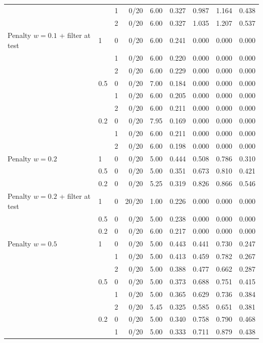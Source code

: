 {\begin{tabular}{llrrrrrrr}
 &  & 1 & 0/20 & 6.00 & 0.327 & 0.987 & 1.164 & 0.438 \\
 &  & 2 & 0/20 & 6.00 & 0.327 & 1.035 & 1.207 & 0.537 \\
\addlinespace
Penalty $w{=}0.1$ + filter at test & 1 & 0 & 0/20 & 6.00 & 0.241 & 0.000 & 0.000 & 0.000 \\
 &  & 1 & 0/20 & 6.00 & 0.220 & 0.000 & 0.000 & 0.000 \\
 &  & 2 & 0/20 & 6.00 & 0.229 & 0.000 & 0.000 & 0.000 \\
 & 0.5 & 0 & 0/20 & 7.00 & 0.184 & 0.000 & 0.000 & 0.000 \\
 &  & 1 & 0/20 & 6.00 & 0.205 & 0.000 & 0.000 & 0.000 \\
 &  & 2 & 0/20 & 6.00 & 0.211 & 0.000 & 0.000 & 0.000 \\
 & 0.2 & 0 & 0/20 & 7.95 & 0.169 & 0.000 & 0.000 & 0.000 \\
 &  & 1 & 0/20 & 6.00 & 0.211 & 0.000 & 0.000 & 0.000 \\
 &  & 2 & 0/20 & 6.00 & 0.198 & 0.000 & 0.000 & 0.000 \\
\addlinespace
Penalty $w{=}0.2$ & 1 & 0 & 0/20 & 5.00 & 0.444 & 0.508 & 0.786 & 0.310 \\
 & 0.5 & 0 & 0/20 & 5.00 & 0.351 & 0.673 & 0.810 & 0.421 \\
 & 0.2 & 0 & 0/20 & 5.25 & 0.319 & 0.826 & 0.866 & 0.546 \\
\addlinespace
Penalty $w{=}0.2$ + filter at test & 1 & 0 & 20/20 & 1.00 & 0.226 & 0.000 & 0.000 & 0.000 \\
 & 0.5 & 0 & 0/20 & 5.00 & 0.238 & 0.000 & 0.000 & 0.000 \\
 & 0.2 & 0 & 0/20 & 6.00 & 0.217 & 0.000 & 0.000 & 0.000 \\
\addlinespace
Penalty $w{=}0.5$ & 1 & 0 & 0/20 & 5.00 & 0.443 & 0.441 & 0.730 & 0.247 \\
 &  & 1 & 0/20 & 5.00 & 0.413 & 0.459 & 0.782 & 0.267 \\
 &  & 2 & 0/20 & 5.00 & 0.388 & 0.477 & 0.662 & 0.287 \\
 & 0.5 & 0 & 0/20 & 5.00 & 0.373 & 0.688 & 0.751 & 0.415 \\
 &  & 1 & 0/20 & 5.00 & 0.365 & 0.629 & 0.736 & 0.384 \\
 &  & 2 & 0/20 & 5.45 & 0.325 & 0.585 & 0.651 & 0.381 \\
 & 0.2 & 0 & 0/20 & 5.00 & 0.340 & 0.758 & 0.790 & 0.468 \\
 &  & 1 & 0/20 & 5.00 & 0.333 & 0.711 & 0.879 & 0.438 \\

\end{tabular}}
